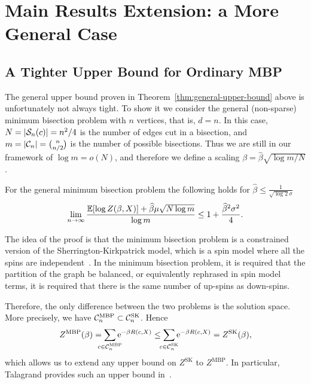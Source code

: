 \section{Main Results Extension: a More General Case}
\label{sec:free_energy_in_general_case}

\subsection{A Tighter Upper Bound for Ordinary MBP}
\label{sec:free_sk}

The general upper bound proven in Theorem~\ref{thm:general-upper-bound} above is
unfortunately not always tight. To show it we consider the general (non-sparse)
minimum bisection problem with $n$ vertices, that is, $d=n$. In this case, $N =
|\S_n(c)| = n^2/4$ is the number of edges cut in a bisection, and
$m=|\C_n|=\binom{n}{n/2}$ is the number of possible bisections.%
Thus we are still in our framework of $\log m =o(N)$, and therefore
we define a scaling $\beta = \hat{\beta}\sqrt{\log m / N}$.

\begin{theorem}
\label{thm:sk_upper_bound}
For the general minimum bisection problem 
the following holds for
$\hat{\beta} \leq \frac{1}{\sqrt{\log 2}\sigma}$
\begin{equation}
  \lim_{n\to \infty} \frac{\E[\log Z(\beta, X)] +\hat \beta \mu \sqrt{N\log m}}{\log m}
    \leq 1 + \frac{\hat{\beta}^2\sigma^2}{4}.
\end{equation}
\end{theorem}
\parsec

\myremark
The idea of the proof is that the minimum bisection problem is a
constrained version of the Sherrington-Kirkpatrick model, which is a
spin model where all the spins are
independent~\citep[cf.][]{sk75spin}. In the minimum bisection
problem, it is required that the partition of the graph be balanced,
or equivalently rephrased in spin model terms, it is required that
there is the same number of up-spins as down-spins.

Therefore, the only difference between the two problems is the
solution space.  More precisely, we have
$\C_n^{\text{MBP}}\subset\C_n^{\text{SK}}$. Hence
\begin{equation}
  Z^{\text{MBP}}(\beta) = \sum_{\mathclap{c\in\C_n^{\text{MBP}}}}\e^{-\beta R(c,X)}
    \leq \sum_{\mathclap{c\in\C_n^{\text{SK}}}}\e^{-\beta R(c,X)} = Z^{\text{SK}}(\beta),
\end{equation}
which allows us to extend any upper bound on $Z^{\text{SK}}$ to
$Z^{\text{MBP}}$.  In particular, Talagrand provides such an upper
bound in~\citep{talagrand03}.
\parsec

